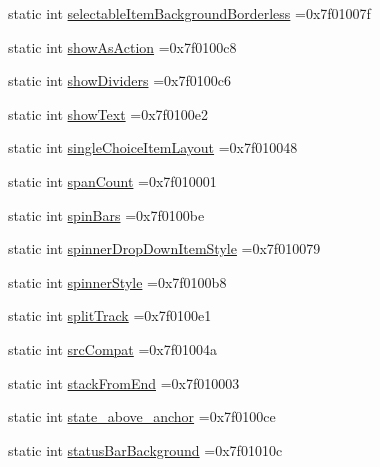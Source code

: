 \begin{DoxyCompactItemize}
\item 
static int \hyperlink{classandroid_1_1support_1_1v7_1_1recyclerview_1_1R_1_1attr_afe6bf2d2a2eb019626350bef2a6cbec3}{selectable\+Item\+Background\+Borderless} =0x7f01007f
\item 
static int \hyperlink{classandroid_1_1support_1_1v7_1_1recyclerview_1_1R_1_1attr_a099cf6607a5322614fa0832c75cc539f}{show\+As\+Action} =0x7f0100c8
\item 
static int \hyperlink{classandroid_1_1support_1_1v7_1_1recyclerview_1_1R_1_1attr_abaef1bd896974c2ecb7c4410e32e5989}{show\+Dividers} =0x7f0100c6
\item 
static int \hyperlink{classandroid_1_1support_1_1v7_1_1recyclerview_1_1R_1_1attr_ac396d0fc6bf6108f05b44ac0ecc38c3e}{show\+Text} =0x7f0100e2
\item 
static int \hyperlink{classandroid_1_1support_1_1v7_1_1recyclerview_1_1R_1_1attr_a626ebfe55aed84739afc39440a74bcb3}{single\+Choice\+Item\+Layout} =0x7f010048
\item 
static int \hyperlink{classandroid_1_1support_1_1v7_1_1recyclerview_1_1R_1_1attr_aee75cbd8a9f6dbd4f25da2bacd1abe90}{span\+Count} =0x7f010001
\item 
static int \hyperlink{classandroid_1_1support_1_1v7_1_1recyclerview_1_1R_1_1attr_a22ff6f4c4baa02a931f86e4fa1e46bf4}{spin\+Bars} =0x7f0100be
\item 
static int \hyperlink{classandroid_1_1support_1_1v7_1_1recyclerview_1_1R_1_1attr_a22bda7d75a845b028031de2ae3ae6785}{spinner\+Drop\+Down\+Item\+Style} =0x7f010079
\item 
static int \hyperlink{classandroid_1_1support_1_1v7_1_1recyclerview_1_1R_1_1attr_add00d782ec20738f241cee6e09f89093}{spinner\+Style} =0x7f0100b8
\item 
static int \hyperlink{classandroid_1_1support_1_1v7_1_1recyclerview_1_1R_1_1attr_ae655a2b7105f20b3c3188361fa22160c}{split\+Track} =0x7f0100e1
\item 
static int \hyperlink{classandroid_1_1support_1_1v7_1_1recyclerview_1_1R_1_1attr_af04c5670ad28df7859bd00c6a3535d94}{src\+Compat} =0x7f01004a
\item 
static int \hyperlink{classandroid_1_1support_1_1v7_1_1recyclerview_1_1R_1_1attr_ad9c45e4cdcbd483c78de77bf71c93b4a}{stack\+From\+End} =0x7f010003
\item 
static int \hyperlink{classandroid_1_1support_1_1v7_1_1recyclerview_1_1R_1_1attr_ad7cb90c06b78b041f7a48b35609fdfc6}{state\+\_\+above\+\_\+anchor} =0x7f0100ce
\item 
static int \hyperlink{classandroid_1_1support_1_1v7_1_1recyclerview_1_1R_1_1attr_abd953a9446d21bb5122214876a4d4a55}{status\+Bar\+Background} =0x7f01010c

\end{DoxyCompactItemize}
